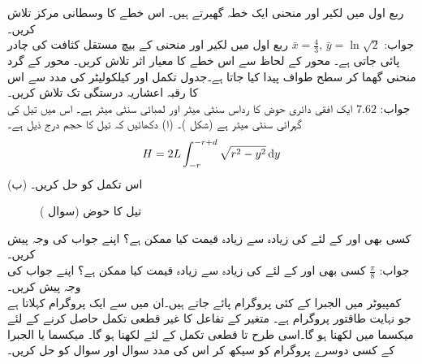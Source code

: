 ربع اول میں لکیر  اور منحنی  ایک خطہ گھیرتے ہیں۔ اس خطے کا وسطانی مرکز تلاش کریں۔ \\
جواب:\quad
$\bar{x}=\tfrac{4}{3},\,\bar{y}=\ln\sqrt{2}$
ربع اول میں لکیر  اور منحنی  کے بیچ مستقل کثافت  کی چادر پائی جاتی ہے۔ محور  کے لحاظ سے اس خطے کا معیار اثر تلاش کریں۔
محور  کے گرد منحنی  گھما کر سطح طواف پیدا کیا جاتا ہے۔جدول تکمل اور کیلکولیٹر کی مدد سے اس کا رقبہ  اعشاریہ درستگی تک تلاش کریں۔\\
جواب:\quad
$7.62$
ایک افقی دائری حوض کا رداس  سنٹی میٹر اور لمبائی  سنٹی میٹر ہے۔ اس میں تیل کی گہرائی  سنٹی میٹر ہے (شکل )۔ (ا) دکھائیں کہ تیل کا حجم درج ذیل ہے۔
\begin{align*}
H=2L\int_{-r}^{-r+d}\sqrt{r^2-y^2}\dif y
\end{align*}
(ب) اس تکمل کو حل کریں۔
\begin{figure}
\centering
{}
\caption{تیل کا حوض (سوال )}
\label{شکل_سوال_طریقہ_حوض_تیل}
\end{figure}

کسی بھی  اور  کے لئے  کی زیادہ سے زیادہ قیمت کیا ممکن ہے؟ اپنے جواب کی وجہ پیش کریں۔\\
جواب:\quad
$\tfrac{\pi}{8}$
کسی بھی  اور  کے لئے  کی زیادہ سے زیادہ قیمت کیا ممکن ہے؟ اپنے جواب کی وجہ پیش کریں۔
\\
 کمپیوٹر میں الجبرا کے کئی پروگرام پائے جاتے ہیں۔ان میں سے ایک پروگرام  کہلاتا ہے جو نہایت طاقتور پروگرام ہے۔ متغیر  کے تفاعل  کا غیر قطعی تکمل حاصل کرنے کے لئے میکسما میں  لکھنا ہو گا۔اسی طرح  تا  قطعی تکمل کے لئے  لکھنا ہو گا۔ میکسما یا الجبرا کے کسی دوسرے پروگرام کو سیکھ کر اس کی مدد  سوال  اور سوال  کو حل کریں۔

